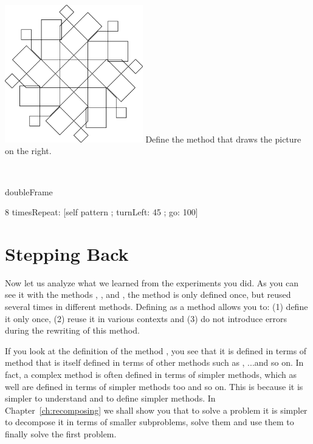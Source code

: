 

\begin{exofigwithsize}[0.5]{\includegraphics[width=6cm]{compArtNouveauGiantScr}}
Define the method  that draws the picture on the right. 

\

\begin{nalltt}
doubleFrame

    8 timesRepeat: [self pattern ;
                                     turnLeft: 45 ;
                                     go: 100]
\end{nalltt}
\end{exofigwithsize}


\section{Stepping Back}
Now let us analyze what we learned from the experiments you did. As you can see it with the methods , , and , the method  is only defined once, but reused several times in different methods. Defining  as a method allows you to: (1) define it only
once, (2) reuse it in various contexts and (3) do not introduce errors during the rewriting of this method. 

If you look at the definition of the method , you see that it is defined in terms of  method that is itself defined in terms of other methods such as \go, \turnLeft...and so on. In fact, a complex method is often defined in terms of simpler methods, which as well are defined in terms of simpler methods too and so on. This is because it is simpler to understand and to define simpler methods.  In Chapter~\ref{ch:recomposing} we shall show you that to solve a problem it is simpler to decompose it in terms of smaller subproblems, solve them and use them to finally solve the first problem. 

